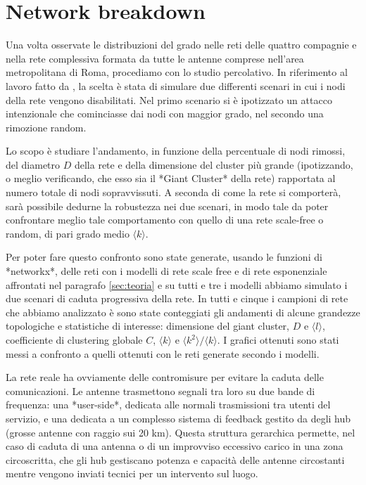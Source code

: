 
\section{Network breakdown}
\label{sec:attaack}

Una volta osservate le distribuzioni del grado nelle reti delle quattro compagnie e nella rete complessiva formata da tutte le antenne comprese nell'area metropolitana di Roma, procediamo con lo studio percolativo. In riferimento al lavoro fatto da \textcite{Barbalbert2000}, la scelta è stata di simulare due differenti scenari in cui i nodi della rete vengono disabilitati. Nel primo scenario si è ipotizzato un attacco intenzionale che cominciasse dai nodi con maggior grado, nel secondo una rimozione random. 

Lo scopo è studiare l'andamento, in funzione della percentuale di nodi rimossi, del diametro $D$ della rete e della dimensione del cluster più grande (ipotizzando, o meglio verificando, che esso sia il *Giant Cluster* della rete) rapportata al numero totale di nodi sopravvissuti. A seconda di come la rete si comporterà, sarà possibile dedurne la robustezza nei due scenari, in modo tale da poter confrontare meglio tale comportamento con quello di una rete scale-free o random, di pari grado medio $\langle k \rangle$.

Per poter fare questo confronto sono state generate, usando le funzioni di *networkx*, delle reti con i modelli di rete scale free e di rete esponenziale affrontati nel paragrafo \ref{sec:teoria} e su tutti e tre i modelli abbiamo simulato i due scenari di caduta progressiva della rete. In tutti e cinque i campioni di rete che abbiamo analizzato è sono state conteggiati gli andamenti di alcune grandezze topologiche e statistiche di interesse: dimensione del giant cluster, $D$ e $\langle l \rangle$, coefficiente di clustering globale $C$, $\langle k \rangle$ e $\langle k^2 \rangle/\langle k \rangle$. I grafici ottenuti sono stati messi a confronto a quelli ottenuti con le reti generate secondo i modelli.

La rete reale ha ovviamente delle contromisure per evitare la caduta delle comunicazioni. Le antenne trasmettono segnali tra loro su due bande di frequenza: una *user-side*, dedicata alle normali trasmissioni tra utenti del servizio, e una dedicata a un complesso sistema di feedback gestito da degli hub (grosse antenne con raggio sui 20 km). Questa struttura gerarchica permette, nel caso di caduta di una antenna o di un improvviso eccessivo carico in una zona circoscritta, che gli hub gestiscano potenza e capacità delle antenne circostanti mentre vengono inviati tecnici per un intervento sul luogo.

